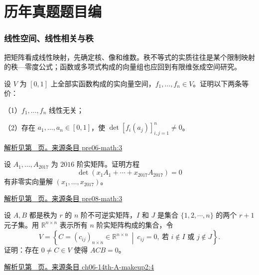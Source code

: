 \documentclass[12pt,fontset=fandol]{ctexart}
\begin{document}
\part{历年真题题目编}

\section{线性空间、线性相关与秩}

\label{sec:questions-1}

把矩阵看成线性映射，先确定核、像和维数。秩不等式的实质往往是某个限制映射的秩—零度公式；函数或多项式构成的向量组也应回到有限维张成空间研究。

\begin{example}\label{ex:pre06-math:3}

设 $V$ 为 $[0,1]$ 上全部实函数构成的实向量空间，$f_1,\ldots,f_n\in V$。证明以下两条等价：

（1）$f_1,\ldots,f_n$ 线性无关；

（2）存在 $a_1,\ldots,a_n\in[0,1]$，使 $\det[f_i(a_j)]_{i,j=1}^n\ne0$。

\par\hyperref[ans:pre06-math:3]{解析见第~\pageref{ans:pre06-math:3} 页。}\quad\href{https://github.com/lzxcr/cmc-mathematics/blob/64916fa1fdbc3e444a652eca204d5669058ee321/src/problems/preliminary/06/03.md}{来源条目 pre06-math:3}

\end{example}

\begin{example}\label{ex:pre08-math:3}

设 $A_1,\ldots,A_{2017}$ 为 $2016$ 阶实矩阵。证明方程
\[
\det(x_1A_1+\cdots+x_{2017}A_{2017})=0
\]
有非零实向量解 $(x_1,\ldots,x_{2017})$。

\par\hyperref[ans:pre08-math:3]{解析见第~\pageref{ans:pre08-math:3} 页。}\quad\href{https://github.com/lzxcr/cmc-mathematics/blob/64916fa1fdbc3e444a652eca204d5669058ee321/src/problems/preliminary/08/03.md}{来源条目 pre08-math:3}

\end{example}

\begin{example}\label{ex:ch06-14th-A-makeup2:4}

设 $A,B$ 都是秩为 $r$ 的 $n$ 阶不可逆实矩阵，$I$ 和 $J$ 是集合 $\{1,2,\cdots,n\}$ 的两个 $r+1$ 元子集。用 $\mathbb{R}^{n\times n}$ 表示所有 $n$ 阶实矩阵构成的集合，令
\[
V=\left\{C=\left(c_{ij}\right)_{n\times n}\in\mathbb{R}^{n\times n}\ \middle|\ c_{ij}=0,\ \text{若 } i\notin I \text{ 或 } j\notin J\right\}.
\]
证明：存在 $0\neq C\in V$ 使得 $ACB=0$。

\par\hyperref[ans:ch06-14th-A-makeup2:4]{解析见第~\pageref{ans:ch06-14th-A-makeup2:4} 页。}\quad\href{https://github.com/lzxcr/cmc-mathematics/blob/64916fa1fdbc3e444a652eca204d5669058ee321/src/problems/preliminary/14-makeup2/04.md}{来源条目 ch06-14th-A-makeup2:4}

\end{example}
\end{document}
